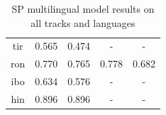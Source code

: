\documentclass[11pt]{article}
\begin{document}
\begin{table}[]
\begin{tabular}{ccccc}
{\color[HTML]{212121} tir}          & {\color[HTML]{212121} 0.565} & {\color[HTML]{212121} 0.474} & -                            & -                            \\
{\color[HTML]{212121} ron}          & {\color[HTML]{212121} 0.770} & {\color[HTML]{212121} 0.765} & {\color[HTML]{212121} 0.778} & {\color[HTML]{212121} 0.682} \\
{\color[HTML]{212121} ibo}          & {\color[HTML]{212121} 0.634} & {\color[HTML]{212121} 0.576} & -                            & -                            \\
{\color[HTML]{212121} hin}          & {\color[HTML]{212121} 0.896} & {\color[HTML]{212121} 0.896} & -                            & -                            \\ \hline
\end{tabular}
\caption{SP multilingual model results on all tracks and languages}
\label{tab:SP_Multilingual}
\end{table}
\end{document}
